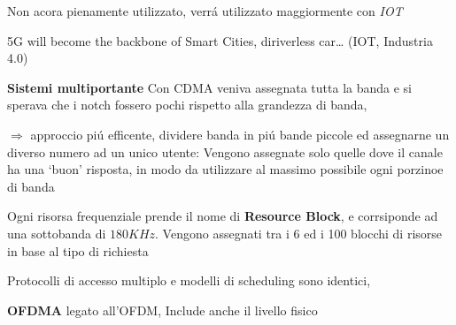 \documentclass{article}
\begin{document}
Non acora pienamente utilizzato, verr\'a utilizzato maggiormente con \textit{IOT}

5G will become the backbone of Smart Cities, diriverless car… (IOT, Industria 4.0)

\textbf{Sistemi multiportante}
Con CDMA veniva assegnata tutta la banda e si sperava che i notch fossero pochi rispetto alla grandezza di banda,

$\Rightarrow$ approccio pi\'u efficente, dividere banda in pi\'u bande piccole ed assegnarne un diverso numero ad un unico utente:
Vengono assegnate solo quelle dove il canale ha una `buon' risposta, in modo da utilizzare al massimo possibile ogni porzinoe di banda


Ogni risorsa frequenziale prende il nome di \textbf{Resource Block}, e corrsiponde ad una sottobanda di $180KHz$.
Vengono assegnati tra i 6 ed i 100 blocchi di risorse in base al tipo di richiesta

Protocolli di accesso multiplo e modelli di scheduling sono identici,

\textbf{OFDMA} legato all'OFDM, Include anche il livello fisico
\end{document}

